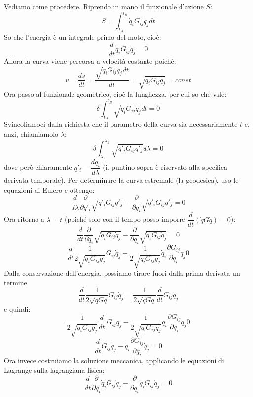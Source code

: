 \documentclass[a4paper,openany]{article}
\begin{document}
	Vediamo come procedere. Riprendo in mano il funzionale d'azione $S$:
	$$ 
	S = \int_{t_A}^{t_B}\dot{q}_iG_{ij}\dot{q}_j dt
	$$
	So che l'energia è un integrale primo del moto, cioè:
	$$
	\dfrac{d}{dt}\dot{q}_iG_{ij}\dot{q}_j = 0
	$$
	Allora la curva viene percorsa a velocità costante poiché:
	$$
	v = \dfrac{ds}{dt} = \dfrac{\sqrt{\dot{q}_iG_{ij}\dot{q}_j}dt}{dt} = \sqrt{\dot{q}_iG_{ij}\dot{q}_j} = const
	$$
	Ora passo al funzionale geometrico, cioè la lunghezza, per cui so che vale:
	\begin{equation}
		\delta \int_{t_A}^{t_B}\sqrt{\dot{q}_iG_{ij}\dot{q}_j}dt  = 0
	\end{equation}
	Svincoliamoci dalla richiesta che il parametro della curva sia necessariamente $t$ e, anzi, chiamiamolo $\lambda$:
	\begin{equation}
		\delta \int_{\lambda_A}^{\lambda_B}\sqrt{q'_iG_{ij}q'_j}d\lambda  = 0
	\end{equation}
	dove però chiaramente $q'_i= \dfrac{dq_i}{d\lambda}$ (il puntino sopra è riservato alla specifica derivata temporale). Per determinare la curva estremale (la geodesica), uso le equazioni di Eulero e ottengo:
	$$
	\dfrac{d}{d\lambda}\dfrac{\partial}{\partial q'_i}\sqrt{q'_iG_{ij}q'_j} - \dfrac{\partial}{\partial q_i}\sqrt{q'_iG_{ij}q'_j} = 0
	$$
	Ora ritorno a $\lambda = t$ (poiché solo con il tempo posso imporre $\dfrac{d}{dt}(\dot{q}G\dot{q})=0$):
	$$
	\dfrac{d}{dt}\dfrac{\partial}{\partial \dot{q}_i}\sqrt{\dot{q}_iG_{ij}\dot{q}_j} - \dfrac{\partial}{\partial q_i}\sqrt{\dot{q}_iG_{ij}\dot{q}_j} = 0
	$$
	$$
	\dfrac{d}{dt}\dfrac{1}{2\sqrt{\dot{q}_iG_{ij}\dot{q}_j}} G_{ij}\dot{q}_j - \dfrac{1}{2\sqrt{\dot{q}_i G_{ij}\dot{q}_j}} \dot{q}_i \frac{\partial G_{ij} }{\partial q_i} \dot{q}_j 0
	$$
	Dalla conservazione dell'energia, possiamo tirare fuori dalla prima derivata un termine
	$$
	\dfrac{d}{dt}\dfrac{1}{2\sqrt{\dot{q}G\dot{q}}}G_{ij} \dot{q}_j =\dfrac{1}{2\sqrt{\dot{q}G\dot{q}}} \dfrac{d}{dt}G_{ij} \dot{q}_j
	$$
	e quindi:
	$$
	\dfrac{1}{2\sqrt{\dot{q}_iG_{ij}\dot{q}_j}}\dfrac{d}{dt}\ G_{ij}\dot{q}_j - \dfrac{1}{2\sqrt{\dot{q}_i G_{ij}\dot{q}_j}} \dot{q}_i \frac{\partial G_{ij} }{\partial q_i} \dot{q}_j 0
	$$
	\begin{equation}
		\dfrac{d}{dt} G_{ij}\dot{q}_j -\dot{q}_i \frac{\partial G_{ij} }{\partial q_i} \dot{q}_j = 0	\label{SoluzGeom}
	\end{equation}
	Ora invece costruiamo la soluzione meccanica, applicando le equazioni di Lagrange sulla lagrangiana fisica:
	$$
	\dfrac{d}{dt}\dfrac{\partial }{\partial \dot{q}_i}\dot{q}_i G_{ij} \dot{q}_j - \dfrac{\partial }{\partial q_i}\dot{q}_i G_{ij} \dot{q}_j = 0 
	$$
\end{document}

